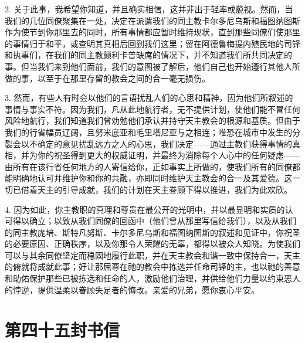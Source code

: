 2. 关于此事，我希望你知道，并且确实相信，这并非出于轻率或藐视。然而，当我们的几位同僚聚集在一处，决定在派遣我们的同主教卡尔多尼乌斯和福图纳图斯作为使节到你那里去的同时，所有事情都应暂时维持现状，直到那些同僚们使那里的事情归于和平，或查明其真相后回到我们这里；留在阿德鲁梅提内殖民地的司铎和执事们，在我们的同主教颇利卡普缺席的情况下，并不知道我们所共同决定的事。但当我们来到他们面前，我们的意图被了解后，他们自己也开始遵行其他人所做的事，以至于在那里存留的教会之间的合一毫无损伤。\par

3. 然而，有些人有时会以他们的言语扰乱人们的心思和精神，因为他们所叙述的事情与事实不符。因为我们，凡从此地航行者，无不提供计划，使他们能不冒任何风险地航行，我们知道我们曾劝勉他们承认并持守天主教会的根源和基质。但由于我们的行省幅员辽阔，且努米底亚和毛里塔尼亚与之相连；唯恐在城市中发生的分裂会以不确定的意见扰乱远方之人的心思，我们决定——通过主教们获得事情的真相，并为你的祝圣得到更大的权威证明，并最终为消除每个人心中的任何疑虑——由所有在该行省任何地方的人寄信给你，正如事实上所做的，使我们所有的同僚都能明确地认可并维护你和你的共融，亦即同时维护天主教会的合一及其爱德。这一切已借着天主的引导成就，我们的计划在天主眷顾下得以推进，我们为此欢欣。\par

4. 因为如此，你主教职的真理和尊贵在最公开的光明中，并以最显明和实质的认可得以确立；以致从我们同僚的回函中（他们曾从那里写信给我们），以及从我们的同主教庞培、斯特凡努斯、卡尔多尼乌斯和福图纳图斯的叙述和见证中，你祝圣的必要原因、正确秩序，以及你那令人荣耀的无辜，都得以被众人知晓。为使我们可以与其余同僚坚定而稳固地履行此职，并在天主教会和谐一致中保持合一，天主的俯就将成就此事；好让那屈尊在祂的教会中拣选并任命司铎的主，也以祂的善意和助佑保护那些已被拣选和任命的人，激励他们治理，并供给他们力量以约束恶人的悖逆，提供温柔以眷顾失足者的悔改。亲爱的兄弟，愿你衷心平安。\par



\section{第四十五封书信}

\par


